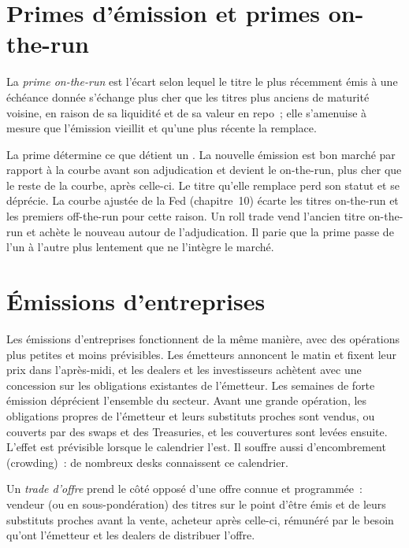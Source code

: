 \section{Primes d'émission et primes on-the-run}

\begin{definition}\label{def:s2:supply-trades:otr}
La \emph{prime on-the-run} est l'écart selon lequel le titre le plus récemment émis à une échéance donnée s'échange plus cher que les titres plus anciens
de maturité voisine, en raison de sa liquidité et de sa valeur en repo~; elle s'amenuise à mesure que l'émission vieillit et qu'une plus récente la remplace.
\end{definition}

La prime détermine ce que détient un . La nouvelle émission est bon marché par rapport à la courbe avant son adjudication et devient le on-the-run, plus cher que le reste de la courbe, après celle-ci. Le
titre qu'elle remplace perd son statut et se déprécie. La courbe ajustée de la Fed (chapitre~10) écarte les titres on-the-run et les premiers off-the-run pour cette
raison. Un roll trade vend l'ancien titre on-the-run et achète le nouveau autour de l'adjudication. Il parie que la prime passe de l'un à l'autre
plus lentement que ne l'intègre le marché.

\section{Émissions d'entreprises}

Les émissions d'entreprises fonctionnent de la même manière, avec des opérations plus petites et moins prévisibles. Les émetteurs annoncent le matin et fixent leur prix dans l'après-midi, et les dealers
et les investisseurs achètent avec une concession sur les obligations existantes de l'émetteur. Les semaines de forte émission déprécient l'ensemble du secteur. Avant une grande opération, les
obligations propres de l'émetteur et leurs substituts proches sont vendus, ou couverts par des swaps et des Treasuries, et les couvertures sont levées ensuite. L'effet est prévisible lorsque le
calendrier l'est. Il souffre aussi d'encombrement (crowding)~: de nombreux desks connaissent ce calendrier.

\begin{definition}\label{def:s2:supply-trades:trade}
Un \emph{trade d'offre} prend le côté opposé d'une offre connue et programmée~: vendeur (ou en sous-pondération) des titres sur le point d'être émis
et de leurs substituts proches avant la vente, acheteur après celle-ci, rémunéré par le besoin qu'ont l'émetteur et les dealers de distribuer l'offre.
\end{definition}

